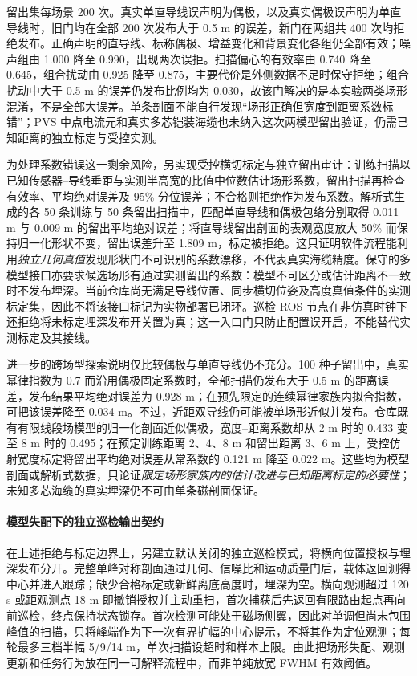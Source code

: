 留出集每场景 200 次。真实单直导线误声明为偶极，以及真实偶极误声明为单直导线时，旧门均在全部 200 次发布大于 0.5 m 的误差，新门在两组共 400 次均拒绝发布。正确声明的直导线、标称偶极、增益变化和背景变化各组仍全部有效；噪声组由 1.000 降至 0.990，出现两次误拒。扫描偏心的有效率由 0.740 降至 0.645，组合扰动由 0.925 降至 0.875，主要代价是外侧数据不足时保守拒绝；组合扰动中大于 0.5 m 的误差仍发布比例均为 0.030，故该门解决的是本实验两类场形混淆，不是全部大误差。单条剖面不能自行发现``场形正确但宽度到距离系数标错''；PVS 中点电流元和真实多芯铠装海缆也未纳入这次两模型留出验证，仍需已知距离的独立标定与受控实测。

为处理系数错误这一剩余风险，另实现受控横切标定与独立留出审计：训练扫描以已知传感器--导线垂距与实测半高宽的比值中位数估计场形系数，留出扫描再检查有效率、平均绝对误差及 95\% 分位误差；不合格则拒绝作为发布系数。解析式生成的各 50 条训练与 50 条留出扫描中，匹配单直导线和偶极包络分别取得 0.011 m 与 0.009 m 的留出平均绝对误差；将直导线留出剖面的表观宽度放大 50\% 而保持归一化形状不变，留出误差升至 1.809 m，标定被拒绝。这只证明软件流程能利用\emph{独立几何真值}发现形状门不可识别的系数漂移，不代表真实海缆精度。保守的多模型接口亦要求候选场形有通过实测留出的系数：模型不可区分或估计距离不一致时不发布埋深。当前仓库尚无满足导线位置、同步横切位姿及高度真值条件的实测标定集，因此不将该接口标记为实物部署已闭环。巡检 ROS 节点在非仿真时钟下还拒绝将未标定埋深发布开关置为真；这一入口门只防止配置误开启，不能替代实测标定及其接线。

进一步的跨场型探索说明仅比较偶极与单直导线仍不充分。100 种子留出中，真实幂律指数为 0.7 而沿用偶极固定系数时，全部扫描仍发布大于 0.5 m 的距离误差，发布结果平均绝对误差为 0.928 m；在预先限定的连续幂律家族内拟合指数，可把该误差降至 0.034 m。不过，近距双导线仍可能被单场形近似并发布。仓库既有有限线段场模型的归一化剖面近似偶极，宽度--距离系数却从 2 m 时的 0.433 变至 8 m 时的 0.495；在预定训练距离 2、4、8 m 和留出距离 3、6 m 上，受控仿射宽度标定将留出平均绝对误差从常系数的 0.121 m 降至 0.022 m。这些均为模型剖面或解析式数据，只论证\emph{限定场形家族内的估计改进与已知距离标定的必要性}；未知多芯海缆的真实埋深仍不可由单条磁剖面保证。

\paragraph{模型失配下的独立巡检输出契约}\label{sec:ch05-inspection-contract}

在上述拒绝与标定边界上，另建立默认关闭的独立巡检模式，将横向位置授权与埋深发布分开。完整单峰对称剖面通过几何、信噪比和运动质量门后，载体返回测得中心并进入跟踪；缺少合格标定或新鲜离底高度时，埋深为空。横向观测超过 120 s 或距观测点 18 m 即撤销授权并主动重扫，首次捕获后先返回有限路由起点再向前巡检，终点保持状态锁存。首次检测可能处于磁场侧翼，因此对单调但尚未包围峰值的扫描，只将峰端作为下一次有界扩幅的中心提示，不将其作为定位观测；每轮最多三档半幅 5/9/14 m，单次扫描设超时和样本上限。由此把场形失配、观测更新和任务行为放在同一可解释流程中，而非单纯放宽 FWHM 有效阈值。

